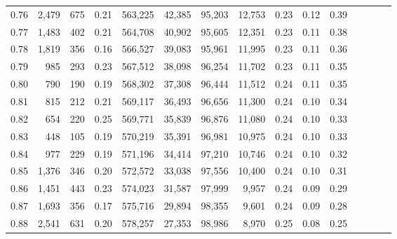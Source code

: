 \begin{tabular}{rrrcrrrrrrrrrrr}
0.76 &   2,479 &    675 &                                       0.21 &  563,225 &   42,385 &   95,203 &   12,753 &  0.23 &  0.12 &                         0.39 \\
0.77 &   1,483 &    402 &                                       0.21 &  564,708 &   40,902 &   95,605 &   12,351 &  0.23 &  0.11 &                         0.38 \\
0.78 &   1,819 &    356 &                                       0.16 &  566,527 &   39,083 &   95,961 &   11,995 &  0.23 &  0.11 &                         0.36 \\
0.79 &     985 &    293 &                                       0.23 &  567,512 &   38,098 &   96,254 &   11,702 &  0.23 &  0.11 &                         0.35 \\
0.80 &     790 &    190 &                                       0.19 &  568,302 &   37,308 &   96,444 &   11,512 &  0.24 &  0.11 &                         0.35 \\
0.81 &     815 &    212 &                                       0.21 &  569,117 &   36,493 &   96,656 &   11,300 &  0.24 &  0.10 &                         0.34 \\
0.82 &     654 &    220 &                                       0.25 &  569,771 &   35,839 &   96,876 &   11,080 &  0.24 &  0.10 &                         0.33 \\
0.83 &     448 &    105 &                                       0.19 &  570,219 &   35,391 &   96,981 &   10,975 &  0.24 &  0.10 &                         0.33 \\
0.84 &     977 &    229 &                                       0.19 &  571,196 &   34,414 &   97,210 &   10,746 &  0.24 &  0.10 &                         0.32 \\
0.85 &   1,376 &    346 &                                       0.20 &  572,572 &   33,038 &   97,556 &   10,400 &  0.24 &  0.10 &                         0.31 \\
0.86 &   1,451 &    443 &                                       0.23 &  574,023 &   31,587 &   97,999 &    9,957 &  0.24 &  0.09 &                         0.29 \\
0.87 &   1,693 &    356 &                                       0.17 &  575,716 &   29,894 &   98,355 &    9,601 &  0.24 &  0.09 &                         0.28 \\
0.88 &   2,541 &    631 &                                       0.20 &  578,257 &   27,353 &   98,986 &    8,970 &  0.25 &  0.08 &                         0.25 \\

\end{tabular}
